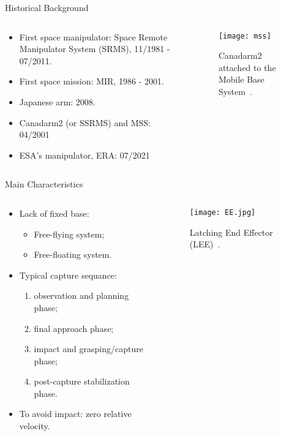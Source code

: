 \begin{frame}{Historical Background}
\begin{columns}
\begin{column}{0.5 \textwidth}  
\begin{itemize}
    \item First space manipulator: Space Remote Manipulator System (SRMS), 11/1981 - 07/2011.
    \item First space mission: MIR, 1986 - 2001.
    \item Japanese arm: 2008.
    \item Canadarm2 (or SSRMS) and MSS: 04/2001
    \item ESA's manipulator, ERA: 07/2021
\end{itemize}
\end{column}
\begin{column}{0.5 \textwidth}  
    \begin{figure}
        \centering
        \texttt{[image: mss]}
        \caption{Canadarm2 attached to the Mobile Base System~\cite{mss_wiki}.}
    \end{figure}
\end{column}
\end{columns}
\end{frame}

\begin{frame}{Main Characteristics}
    \begin{columns}
        \begin{column}{0.5 \textwidth}
    \begin{itemize}
        \item Lack of fixed base:
            \begin{itemize}
            \item Free-flying system;
            \item Free-floating system.
            \end{itemize}
        \item Typical capture sequance:
            \begin{enumerate}
                \item observation and planning phase;
                \item final approach phase;
                \item impact and grasping/capture phase;
                \item post-capture stabilization phase.
            \end{enumerate}
        \item To avoid impact: zero relative velocity.
    \end{itemize}
        \end{column} 
        \begin{column}{0.5 \textwidth}
            \begin{figure}
                \centering
                \texttt{[image: EE.jpg]}
                \caption{Latching End Effector (LEE)~\cite{mss_wiki}.}
            \end{figure}
        \end{column}       
    \end{columns}
\end{frame}

